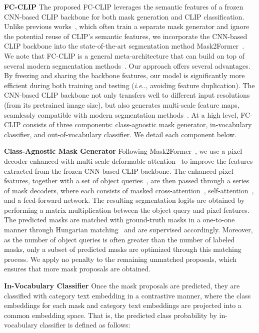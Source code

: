\documentclass{article}
\makeatletter
\DeclareRobustCommand\onedot{\futurelet\@let@token\@onedot}
\def\@onedot{\ifx\@let@token.\else.\null\fi\xspace}
\def\ie{\emph{i.e}\onedot}
\newcommand{\modelname}{FC-CLIP\xspace}
\makeatother
\begin{document}
\noindent \textbf{\modelname}\quad
The proposed \modelname leverages the semantic features of a frozen CNN-based CLIP backbone for both mask generation and CLIP classification.
Unlike previous works~\cite{xu2021simple,liang2022open,ding2022open,xu2023open}, which often train a separate mask generator and ignore the potential reuse of CLIP's semantic features, we incorporate the CNN-based CLIP backbone into the state-of-the-art segmentation method Mask2Former~\cite{cheng2021masked}.
We note that \modelname is a general meta-architecture that can build on top of several modern segmentation methods~\cite{cheng2021masked,yu2022k}.
Our approach offers several advantages.
By freezing and sharing the backbone features, our model is significantly more efficient during both training and testing (\ie, avoiding feature duplication).
The CNN-based CLIP backbone not only transfers well to different input resolutions (from its pretrained image size), but also generates multi-scale feature maps, seamlessly compatible with modern segmentation methods~\cite{cheng2021masked,yu2022k}.
At a high level, \modelname consists of three components: class-agnostic mask generator, in-vocabulary classifier, and out-of-vocabulary classifier. We detail each component below.

\noindent \textbf{Class-Agnostic Mask Generator}\quad
Following Mask2Former~\cite{cheng2021masked}, we use a pixel decoder enhanced with multi-scale deformable attention~\cite{zhu2020deformable} to improve the features extracted from the frozen CNN-based CLIP backbone.
The enhanced pixel features, together with a set of object queries~\cite{carion2020end, wang2021max}, are then passed through a series of mask decoders, where each consists of masked cross-attention~\cite{cheng2021masked}, self-attention~\cite{vaswani2017attention}, and a feed-forward network.
The resulting segmentation logits are obtained by performing a matrix multiplication between the object query and pixel features.
The predicted masks are matched with ground-truth masks in a one-to-one manner through Hungarian matching~\cite{Kuhn1955NAVAL} and are supervised accordingly.
Moreover, as the number of object queries is often greater than the number of labeled masks, only a subset of predicted masks are optimized through this matching process. We apply no penalty to the remaining unmatched proposals, which ensures that more mask proposals are obtained.

\noindent \textbf{In-Vocabulary Classifier}\quad
Once the mask proposals are predicted, they are classified with category text embedding in a contrastive manner, where the class embeddings for each mask and category text embeddings are projected into a common embedding space. That is, the predicted class probability by in-vocabulary classifier is defined as follows:  
\end{document}
